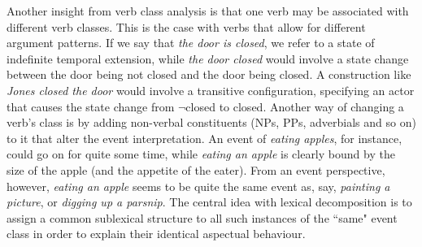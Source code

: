 Another insight from verb class analysis is that one verb may be associated with different verb classes. This is the case with verbs that allow for different argument patterns. If we say that \textit{the door is closed}, we refer to a state of indefinite temporal extension, while \textit{the door closed} would involve a state change between the door being not closed and the door being closed. A construction like \textit{Jones closed the door} would involve a transitive configuration, specifying an actor that causes the state change from $\neg$closed to closed. Another way of changing a verb's class is by adding non-verbal constituents (NPs, PPs, adverbials and so on) to it that alter the event interpretation. An event of \textit{eating apples}, for instance, could go on for quite some time, while \textit{eating an apple} is clearly bound by the size of the apple (and the appetite of the eater). From an event perspective, however, \textit{eating an apple} seems to be quite the same event as, say, \textit{painting a picture}, or \textit{digging up a parsnip}. The central idea with lexical decomposition is to assign a common sublexical structure to all such instances of the ``same" event class in order to explain their identical aspectual behaviour.

